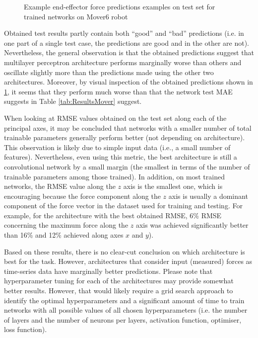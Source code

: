\begin{figure}
    \hfil
    \caption{Example end-effector force predictions examples on test set for trained networks on Mover6 robot}
    \label{fig:Graphs}
\end{figure}

Obtained test results partly contain both ``good'' and ``bad'' predictions (i.e. in one part of a single test case, the predictions are good and in the other are not). Nevertheless, the general observation is that the obtained predictions suggest that multilayer perceptron architecture performs marginally worse than others and oscillate slightly more than the predictions made using the other two architectures. Moreover, by visual inspection of the obtained predictions shown in \cref{fig:Graphs}, it seems that they perform much worse than that the network test MAE suggests in Table \ref{tab:ResultsMover} suggest.

When looking at RMSE values obtained on the test set along each of the principal axes, it may be concluded that networks with a smaller number of total trainable parameters generally perform better (not depending on architecture). This observation is likely due to simple input data (i.e., a small number of features). Nevertheless, even using this metric, the best architecture is still a convolutional network by a small margin (the smallest in terms of the number of trainable parameters among those trained). In addition, on most trained networks, the RMSE value along the $z$ axis is the smallest one, which is encouraging because the force component along the $z$ axis is usually a dominant component of the force vector in the dataset used for training and testing. For example, for the architecture with the best obtained RMSE, 6\% RMSE concerning the maximum force along the $z$ axis was achieved significantly better than 16\% and 12\% achieved along axes $x$ and $y$).

Based on these results, there is no clear-cut conclusion on which architecture is best for the task. However, architectures that consider input (measured) forces as time-series data have marginally better predictions. Please note that hyperparameter tuning for each of the architectures may provide somewhat better results. However, that would likely require a grid search approach to identify the optimal hyperparameters and a significant amount of time to train networks with all possible values of all chosen hyperparameters (i.e. the number of layers and the number of neurons per layers, activation function, optimiser, loss function).


